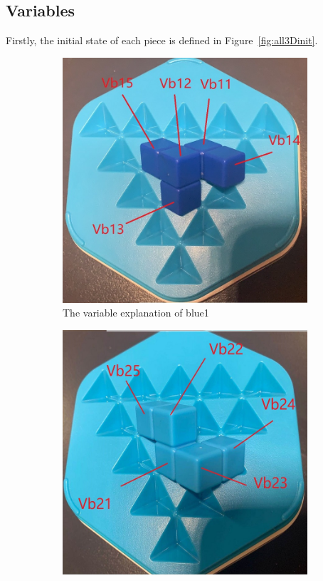 \subsection{Variables}
Firstly, the initial state of each piece is defined in Figure~\ref{fig:all3Dinit}.
\label{section:3Dgame}
\begin{figure}[htbp]
\centering
\begin{subfigure}[b]{0.25\textwidth}
\centering
\includegraphics[width=\textwidth]{figs/3Dblue1.jpg}
\caption{The variable explanation of blue1}
  \label{fig:3Dblue1}
\end{subfigure}
\begin{subfigure}[b]{0.25\textwidth}
\centering
\includegraphics[width=\textwidth]{figs/3Dblue2.jpg}

\end{subfigure}
\end{figure}
